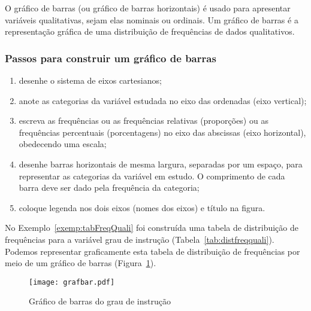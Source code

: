 \documentclass[11pt,fleqn]{book} %
\begin{document}
O gráfico de barras (ou gráfico de barras horizontais) é usado para apresentar variáveis qualitativas, sejam elas nominais ou ordinais. Um gráfico de barras é a representação gráfica de uma distribuição de frequências de dados qualitativos. \\ 


\subsubsection{Passos para construir um gráfico de barras} 

\begin{enumerate}
	\item desenhe o sistema de eixos cartesianos;
	
	\item anote as categorias da variável estudada no eixo das ordenadas (eixo vertical);

	\item escreva as frequências ou as frequências relativas (proporções) ou as frequências percentuais (porcentagens) no eixo das abscissas (eixo horizontal), obedecendo uma escala;
	
	\item desenhe barras horizontais de mesma largura, separadas por um espaço, para representar 
	as categorias da variável em estudo. O comprimento de cada barra deve ser dado pela frequência da categoria;

	\item coloque legenda nos dois eixos (nomes dos eixos) e título na figura. \\
\end{enumerate}



\begin{example} \label{exemp:grafbar} 

No Exemplo~\ref{exemp:tabFreqQuali} foi construída uma tabela de distribuição de frequências para a variável grau de instrução (Tabela~\ref{tab:distfreqquali}). Podemos representar graficamente esta tabela de distribuição de frequências por meio de um gráfico de barras (Figura~\ref{fig:grafbar}).

\begin{figure}[h!]
\centering\texttt{[image: grafbar.pdf]}
\setlength{\abovecaptionskip}{0.5pt}
\caption{Gráfico de barras do grau de instrução}
\label{fig:grafbar} %
\end{figure}


\end{example}
\end{document}
